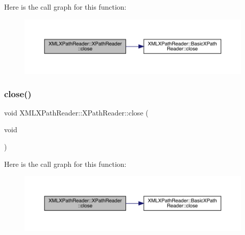 Here is the call graph for this function\+:
\nopagebreak
\begin{figure}[H]
\begin{center}
\leavevmode
\includegraphics[width=350pt]{d3/d5a/classXMLXPathReader_1_1XPathReader_a2b6cfab8c9771da838a2bca6c9f23cb9_cgraph}
\end{center}
\end{figure}
\mbox{\label{classXMLXPathReader_1_1XPathReader_a2b6cfab8c9771da838a2bca6c9f23cb9}} 
\subsubsection{\texorpdfstring{close()}{close()}\hspace{0.1cm}{\footnotesize\ttfamily [3/3]}}
{\footnotesize\ttfamily void X\+M\+L\+X\+Path\+Reader\+::\+X\+Path\+Reader\+::close (\begin{DoxyParamCaption}\item[{void}]{ }\end{DoxyParamCaption})\hspace{0.3cm}{\ttfamily [inline]}}

Here is the call graph for this function\+:
\nopagebreak
\begin{figure}[H]
\begin{center}
\leavevmode
\includegraphics[width=350pt]{d3/d5a/classXMLXPathReader_1_1XPathReader_a2b6cfab8c9771da838a2bca6c9f23cb9_cgraph}
\end{center}
\end{figure}
\mbox{\label{classXMLXPathReader_1_1XPathReader_a9fd76703ea5321a4666ca9a0c07a222a}} 
